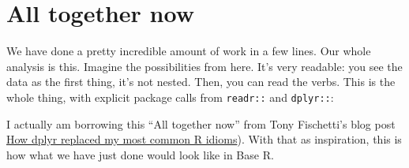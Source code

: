 \documentclass[]{book}
\newenvironment{Shaded}{\begin{snugshade}}{\end{snugshade}}
\newcommand{\KeywordTok}[1]{\textcolor[rgb]{0.13,0.29,0.53}{\textbf{#1}}}
\newcommand{\DataTypeTok}[1]{\textcolor[rgb]{0.13,0.29,0.53}{#1}}
\newcommand{\StringTok}[1]{\textcolor[rgb]{0.31,0.60,0.02}{#1}}
\newcommand{\CommentTok}[1]{\textcolor[rgb]{0.56,0.35,0.01}{\textit{#1}}}
\newcommand{\OperatorTok}[1]{\textcolor[rgb]{0.81,0.36,0.00}{\textbf{#1}}}
\newcommand{\NormalTok}[1]{#1}
\theoremstyle{definition}
\theoremstyle{definition}
\theoremstyle{definition}
\theoremstyle{remark}
\begin{document}
\section{All together now}\label{all-together-now}

We have done a pretty incredible amount of work in a few lines. Our
whole analysis is this. Imagine the possibilities from here. It's very
readable: you see the data as the first thing, it's not nested. Then,
you can read the verbs. This is the whole thing, with explicit package
calls from \texttt{readr::} and \texttt{dplyr::}:

\begin{Shaded}
\end{Shaded}

I actually am borrowing this ``All together now'' from Tony Fischetti's
blog post
\href{http://www.statsblogs.com/2014/02/10/how-dplyr-replaced-my-most-common-r-idioms/}{How
dplyr replaced my most common R idioms}). With that as inspiration, this
is how what we have just done would look like in Base R.
\end{document}

